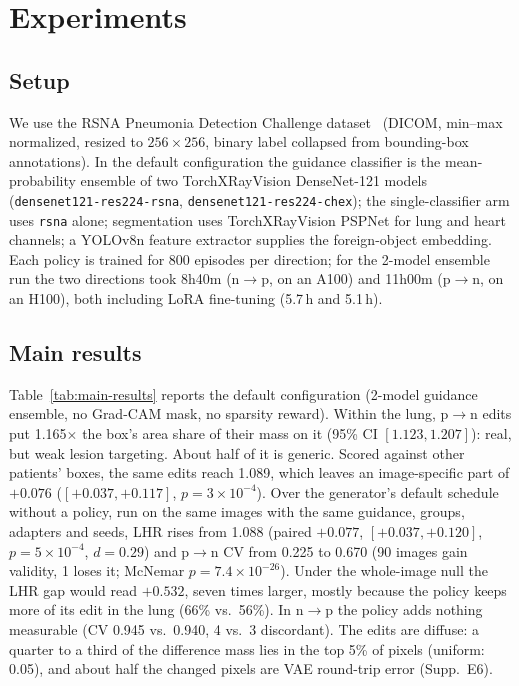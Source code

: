\section{Experiments}
\label{sec:experiments}

\subsection{Setup}
\label{sec:setup}

We use the RSNA Pneumonia Detection Challenge dataset~\cite{rsna2018} (DICOM, min--max normalized, resized to $256\times256$, binary label collapsed from bounding-box annotations). In the default configuration the guidance classifier is the mean-probability ensemble of two TorchXRayVision DenseNet-121 models (\texttt{densenet121-res224-rsna}, \texttt{densenet121-res224-chex}); the single-classifier arm uses \texttt{rsna} alone; segmentation uses TorchXRayVision PSPNet for lung and heart channels; a YOLOv8n feature extractor supplies the foreign-object embedding. Each policy is trained for 800 episodes per direction; for the 2-model ensemble run the two directions took 8h40m (n$\to$p, on an A100) and 11h00m (p$\to$n, on an H100), both including LoRA fine-tuning (5.7\,h and 5.1\,h).

\subsection{Main results}
\label{sec:main-results}

Table~\ref{tab:main-results} reports the default configuration (2-model guidance ensemble, no Grad-CAM mask, no sparsity reward). Within the lung, p$\to$n edits put 1.165$\times$ the box's area share of their mass on it (95\% CI $[1.123, 1.207]$): real, but weak lesion targeting. About half of it is generic. Scored against other patients' boxes, the same edits reach 1.089, which leaves an image-specific part of $+0.076$ ($[+0.037, +0.117]$, $p=3\times10^{-4}$). Over the generator's default schedule without a policy, run on the same images with the same guidance, groups, adapters and seeds, LHR rises from 1.088 (paired $+0.077$, $[+0.037, +0.120]$, $p=5\times10^{-4}$, $d=0.29$) and p$\to$n CV from 0.225 to 0.670 (90 images gain validity, 1 loses it; McNemar $p=7.4\times10^{-26}$). Under the whole-image null the LHR gap would read $+0.532$, seven times larger, mostly because the policy keeps more of its edit in the lung (66\% vs.\ 56\%). In n$\to$p the policy adds nothing measurable (CV 0.945 vs.\ 0.940, 4 vs.\ 3 discordant). The edits are diffuse: a quarter to a third of the difference mass lies in the top 5\% of pixels (uniform: 0.05), and about half the changed pixels are VAE round-trip error (Supp.~E6).

